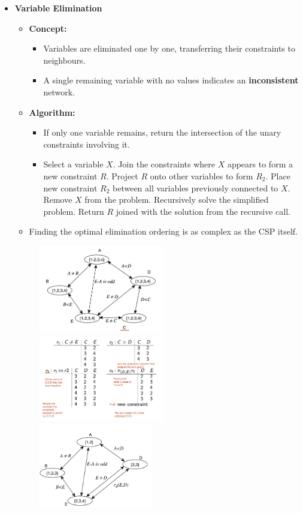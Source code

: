 \documentclass{article}
\theoremstyle{note}
\begin{document}
\begin{itemize}
\begin{itemize}
  \item \textbf{Variable Elimination}
  \begin{itemize}
  \item \textbf{Concept:}
  \begin{itemize}
    \item Variables are eliminated one by one, transferring their constraints to neighbours.
    \item A single remaining variable with no values indicates an \textbf{inconsistent} network.
  \end{itemize}

  \item \textbf{Algorithm:}
  \begin{itemize}
    \item If only one variable remains, return the intersection of the unary constraints involving it.
    \item Select a variable \( X \).
    \subitem Join the constraints where \( X \) appears to form a new constraint \( R \).
    \subitem Project \( R \) onto other variables to form \( R_2 \).
    \subitem Place new constraint \( R_2 \) between all variables previously connected to \( X \).
    \subitem Remove \( X \) from the problem.
    \subitem Recursively solve the simplified problem.
    \subitem Return \( R \) joined with the solution from the recursive call.
  \end{itemize}

  \item Finding the optimal elimination ordering is as complex as the CSP itself.
\end{itemize}
  	\begin{figure}[!htbp]
  	\center
  	\includegraphics[width=5.5cm]{Variable_Elimination_1.png}
  	\includegraphics[width=5.5cm]{Variable_Elimination_3.png}
  	\includegraphics[width=5cm]{Variable_Elimination_2.png}
  	\end{figure}
 \end{itemize}
  	


\end{itemize}
\end{document}

